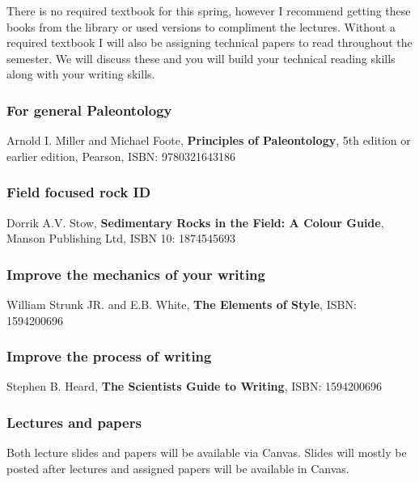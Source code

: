 \documentclass[11pt,]{article}
\begin{document}
There is no required textbook for this spring, however I recommend
getting these books from the library or used versions to compliment the
lectures. Without a required textbook I will also be assigning technical
papers to read throughout the semester. We will discuss these and you
will build your technical reading skills along with your writing skills.

\hypertarget{for-general-paleontology}{%
\subsubsection{For general
Paleontology}\label{for-general-paleontology}}

Arnold I. Miller and Michael Foote, \textbf{Principles of Paleontology},
5th edition or earlier edition, Pearson, ISBN: 9780321643186

\hypertarget{field-focused-rock-id}{%
\subsubsection{Field focused rock ID}\label{field-focused-rock-id}}

Dorrik A.V. Stow, \textbf{Sedimentary Rocks in the Field: A Colour
Guide}, Manson Publishing Ltd, ISBN 10: 1874545693

\hypertarget{improve-the-mechanics-of-your-writing}{%
\subsubsection{Improve the mechanics of your
writing}\label{improve-the-mechanics-of-your-writing}}

William Strunk JR. and E.B. White, \textbf{The Elements of Style}, ISBN:
1594200696

\hypertarget{improve-the-process-of-writing}{%
\subsubsection{Improve the process of
writing}\label{improve-the-process-of-writing}}

Stephen B. Heard, \textbf{The Scientists Guide to Writing}, ISBN:
1594200696

\hypertarget{lectures-and-papers}{%
\subsubsection{Lectures and papers}\label{lectures-and-papers}}

Both lecture slides and papers will be available via Canvas. Slides will
mostly be posted after lectures and assigned papers will be available in
Canvas.
\end{document}
